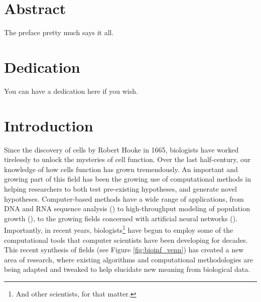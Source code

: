 \documentclass[12pt,twoside]{reedthesis}
\theoremstyle{definition}
\begin{document}
\vfill\vfill


    \tableofcontents
    \listoftables
    \listoffigures

    \chapter*{Abstract}
	The preface pretty much says it all.

	\chapter*{Dedication}
	You can have a dedication here if you wish.

  \mainmatter %
  \pagestyle{fancyplain} %


    \chapter*{Introduction}

\onehalfspacing

Since the discovery of cells by Robert Hooke in 1665, biologists have worked tirelessly to unlock the mysteries of cell function. Over the last half-century, our knowledge of how cells function has grown tremendously. An important and growing part of this field has been the growing use of computational methods in helping researchers to both test pre-existing hypotheses, and generate novel hypotheses. Computer-based methods have a wide range of applications, from DNA and RNA sequence analysis (\cite{humanGenome}) to high-throughput modeling of population growth (\cite{Anderson2005}), to the growing fields concerned with artificial neural networks (\cite{Chon1996}). Importantly, in recent years, biologists\footnote{And other scientists, for that matter.} have begun to employ some of the computational tools that computer scientists have been developing for decades. This recent synthesis of fields (see Figure \ref{fig:bioinf_venn}) has created a new area of research, where existing algorithms and computational methodologies are being adapted and tweaked to help elucidate new meaning from biological data.\par
\end{document}
